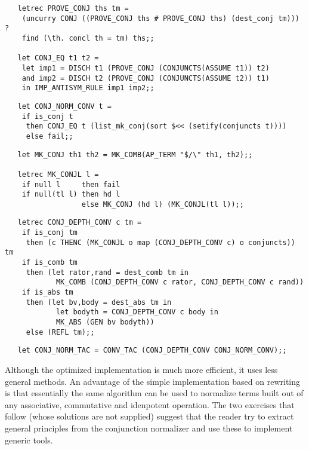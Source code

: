 \begin{hol}\begin{verbatim}
   letrec PROVE_CONJ ths tm =
    (uncurry CONJ ((PROVE_CONJ ths # PROVE_CONJ ths) (dest_conj tm))) ?
    find (\th. concl th = tm) ths;;

   let CONJ_EQ t1 t2 =
    let imp1 = DISCH t1 (PROVE_CONJ (CONJUNCTS(ASSUME t1)) t2)
    and imp2 = DISCH t2 (PROVE_CONJ (CONJUNCTS(ASSUME t2)) t1)
    in IMP_ANTISYM_RULE imp1 imp2;;
\end{verbatim}\end{hol}

\begin{hol}\begin{verbatim}
   let CONJ_NORM_CONV t =
    if is_conj t
     then CONJ_EQ t (list_mk_conj(sort $<< (setify(conjuncts t))))
     else fail;;
\end{verbatim}\end{hol}

\begin{hol}\begin{verbatim}
   let MK_CONJ th1 th2 = MK_COMB(AP_TERM "$/\" th1, th2);;

   letrec MK_CONJL l =
    if null l     then fail
    if null(tl l) then hd l
                  else MK_CONJ (hd l) (MK_CONJL(tl l));;
\end{verbatim}\end{hol}

\begin{hol}\begin{verbatim}
   letrec CONJ_DEPTH_CONV c tm =
    if is_conj tm
     then (c THENC (MK_CONJL o map (CONJ_DEPTH_CONV c) o conjuncts)) tm
    if is_comb tm
     then (let rator,rand = dest_comb tm in
            MK_COMB (CONJ_DEPTH_CONV c rator, CONJ_DEPTH_CONV c rand))
    if is_abs tm
     then (let bv,body = dest_abs tm in
            let bodyth = CONJ_DEPTH_CONV c body in
            MK_ABS (GEN bv bodyth))
     else (REFL tm);;
\end{verbatim}\end{hol}

\begin{hol}\begin{verbatim}
   let CONJ_NORM_TAC = CONV_TAC (CONJ_DEPTH_CONV CONJ_NORM_CONV);;
\end{verbatim}\end{hol}


Although the optimized implementation is much more efficient, it uses
less general methods. An advantage of the simple implementation based
on rewriting is that essentially the same algorithm can be used to
normalize terms built out of any associative, commutative and
idenpotent operation. The two exercises that follow (whose solutions are not
supplied) suggest that the reader try to extract general principles from the
conjunction normalizer and use these to implement generic tools.

